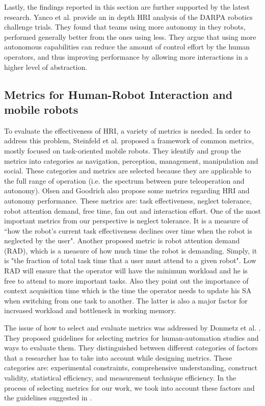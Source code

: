 \documentclass[a4paper,12pt,oneside,openright]{bhamthesis}
\begin{document}
Lastly, the findings reported in this section are further supported by the latest research. Yanco et al. \citep{Yanco2015DARPA} provide an in depth HRI analysis of the DARPA robotics challenge trials. They found that teams using more autonomy in they robots, performed generally better from the ones using less. They argue that using more autonomous capabilities can reduce the amount of control effort by the human operators, and thus improving performance by allowing more interactions in a higher level of abstraction.

\subsection{Metrics for Human-Robot Interaction and mobile robots}
To evaluate the effectiveness of HRI, a variety of metrics is needed. In order to address this problem, Steinfeld et al. \citep{Steinfeld2006} proposed a framework of common metrics, mostly focused on task-oriented mobile robots. They identify and group the metrics into categories as navigation, perception, management, manipulation and social. These categories and metrics are selected because they are applicable to the full range of operation (i.e. the spectrum between pure teleoperation and autonomy). Olsen and Goodrich \citep{Olsen2003} also propose some metrics regarding HRI and autonomy performance. These metrics are: task effectiveness, neglect tolerance, robot attention demand, free time, fan out and interaction effort. One of the most important metrics from our perspective is neglect tolerance. It is a measure of ``how the robot's current task effectiveness declines over time when the robot is neglected by the user". Another proposed metric is robot attention demand (RAD), which is a measure of how much time the robot is demanding. Simply, it is "the fraction of total task time that a user must attend to a given robot". Low RAD will ensure that the operator will have the minimum workload and he is free to attend to more important tasks. Also they point out the importance of context acquisition time which is the time the operator needs to update his SA when switching from one task to another. The latter is also a major factor for increased workload and bottleneck in working memory.

The issue of how to select and evaluate metrics was addressed by Donmetz et al. \citep{Donmez2008}. They proposed guidelines for selecting metrics for human-automation studies and ways to evaluate them. They distinguished between different categories of factors that a researcher has to take into account while designing metrics. These categories are: experimental constraints, comprehensive understanding, construct validity, statistical efficiency, and measurement technique efficiency. In the process of selecting metrics for our work, we took into account these factors and the guidelines suggested in \citep{Donmez2008}.
\end{document}
